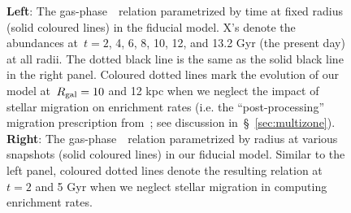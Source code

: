 \documentclass[ms.tex]{subfiles}
\begin{document}
\begin{figure}
\caption{
\textbf{Left}: The gas-phase~\ohno~relation parametrized by time at
fixed radius (solid coloured lines) in the fiducial model. X's denote the
abundances at~$t = 2$, 4, 6, 8, 10, 12, and 13.2 Gyr (the present day) at all
radii.
The dotted black line is the same as the solid black line in the right panel.
Coloured dotted lines mark the evolution of our model at~$R_\text{gal} = 10$ and 12
kpc when we neglect the impact of stellar migration on enrichment rates (i.e.
the ``post-processing'' migration prescription from~\citealp{Johnson2021}; see
discussion in~\S~\ref{sec:multizone}).
\textbf{Right}: The gas-phase~\ohno~relation parametrized by radius at
various snapshots (solid coloured lines) in our fiducial model.
Similar to the left panel, coloured dotted lines denote the resulting relation
at~$t = 2$ and 5 Gyr when we neglect stellar migration in computing enrichment
rates.
}
\label{fig:no_oh_timeevol}
\end{figure}
\end{document}
